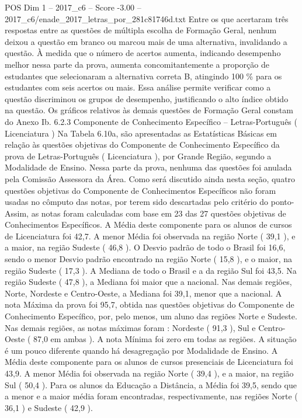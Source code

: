 \begin{textsample}{POS Dim 1 – 2017\_c6 – Score -3.00 – 2017\_c6/enade\_2017\_letras\_por\_281c81746d.txt}
Entre os que acertaram três respostas entre as questões de múltipla escolha de Formação Geral, nenhum deixou a questão em branco ou marcou mais de uma alternativa, invalidando a questão.
À medida que o número de acertos aumenta, indicando desempenho melhor nessa parte da prova, aumenta concomitantemente a proporção de estudantes que selecionaram a alternativa correta B, atingindo 100 \% para os estudantes com seis acertos ou mais.
Essa análise permite verificar como a questão discriminou os grupos de desempenho, justificando o alto índice obtido na questão.
Os gráficos relativos às demais questões de Formação Geral constam do Anexo Ib. 6.2.3 Componente de Conhecimento Específico – Letras-Português ( Licenciatura ) Na Tabela 6.10a, são apresentadas as Estatísticas Básicas em relação às questões objetivas do Componente de Conhecimento Específico da prova de Letras-Português ( Licenciatura ), por Grande Região, segundo a Modalidade de Ensino.
Nessa parte da prova, nenhuma das questões foi anulada pela Comissão Assessora da Área.
Como será discutido ainda nesta seção, quatro questões objetivas do Componente de Conhecimentos Específicos não foram usadas no cômputo das notas, por terem sido descartadas pelo critério do ponto- Assim, as notas foram calculadas com base em 23 das 27 questões objetivas de Conhecimentos Específicos.
A Média deste componente para os alunos de cursos de Licenciatura foi 42,7.
A menor Média foi observada na região Norte ( 39,1 ), e a maior, na região Sudeste ( 46,8 ).
O Desvio padrão de todo o Brasil foi 16,6, sendo o menor Desvio padrão encontrado na região Norte ( 15,8 ), e o maior, na região Sudeste ( 17,3 ).
A Mediana de todo o Brasil e a da região Sul foi 43,5.
Na região Sudeste ( 47,8 ), a Mediana foi maior que a nacional.
Nas demais regiões, Norte, Nordeste e Centro-Oeste, a Mediana foi 39,1, menor que a nacional.
A nota Máxima da prova foi 95,7, obtida nas questões objetivas do Componente de Conhecimento Específico, por, pelo menos, um aluno das regiões Norte e Sudeste.
Nas demais regiões, as notas máximas foram : Nordeste ( 91,3 ), Sul e Centro-Oeste ( 87,0 em ambas ).
A nota Mínima foi zero em todas as regiões.
A situação é um pouco diferente quando há desagregação por Modalidade de Ensino.
A Média deste componente para os alunos de cursos presenciais de Licenciatura foi 43,9.
A menor Média foi observada na região Norte ( 39,4 ), e a maior, na região Sul ( 50,4 ).
Para os alunos da Educação a Distância, a Média foi 39,5, sendo que a menor e a maior média foram encontradas, respectivamente, nas regiões Norte ( 36,1 ) e Sudeste ( 42,9 ).

\end{textsample}
